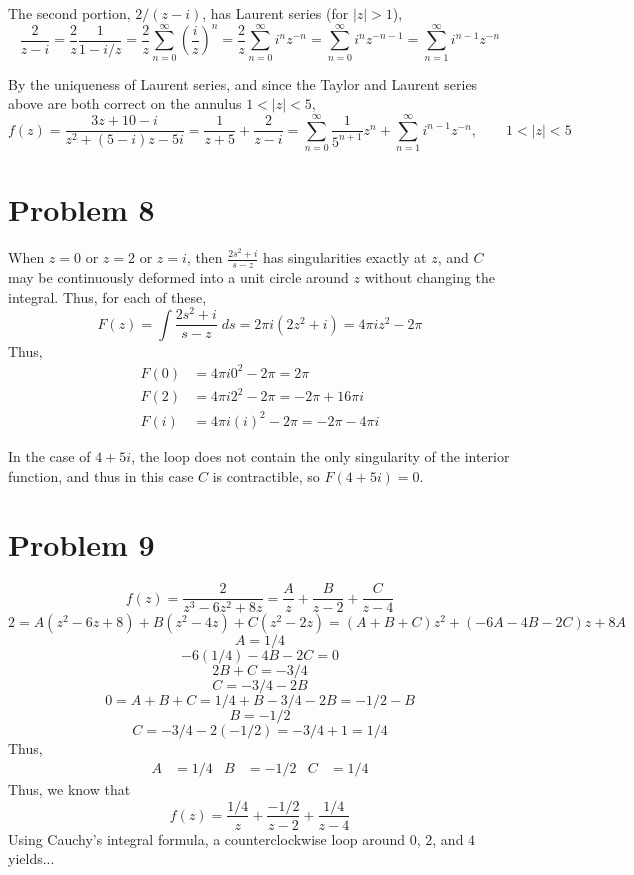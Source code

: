 \documentclass{article}
\theoremstyle{definition}
\newcommand{\p}[1]{\left(#1\right)}
\newcommand{\abs}[1]{\left|#1\right|}
\begin{document}
The second portion, $2/(z-i)$, has Laurent series (for $\abs{z} > 1$),
\[
\frac{2}{z-i} 
= \frac{2}{z} \frac{1}{1-i/z}
= \frac{2}{z} \sum_{n=0}^\infty \p{\frac{i}{z}}^n
= \frac{2}{z} \sum_{n=0}^\infty i^n z^{-n}
= \sum_{n=0}^\infty i^n z^{-n-1}
= \sum_{n=1}^\infty i^{n-1} z^{-n}
\]

By the uniqueness of Laurent series, 
and since the Taylor and Laurent series above are both correct on the annulus
$1 < \abs{z} < 5$, 
\[
f(z) 
= \frac{3z+10-i}{z^2+(5-i)z-5i}
= \frac{1}{z+5} + \frac{2}{z-i}
= \sum_{n=0}^\infty \frac{1}{5^{n+1}} z^n
+ \sum_{n=1}^\infty i^{n-1} z^{-n}, 
\qquad 1 < \abs{z} < 5
\]

\section{Problem 8}
\begin{figure}[h!]
\centering
{}
\end{figure}
When $z=0$ or $z=2$ or $z=i$, then $\frac{2s^2+i}{s-z}$ has singularities exactly at $z$, and 
$C$ may be continuously deformed into a unit circle around $z$ without changing the integral. Thus,
for each of these,
\[ F(z) = \int \frac{2 s^2 + i}{s-z} \;ds = 2 \pi i (2 z^2 + i) = 4 \pi i z^2 - 2 \pi \]
Thus,
\begin{align*}
F(0) &= 4 \pi i 0^2 - 2\pi = 2\pi \\
F(2) &= 4 \pi i 2^2 - 2 \pi = -2 \pi + 16 \pi i \\
F(i) &= 4 \pi i (i)^2 - 2 \pi = -2\pi - 4 \pi i 
\end{align*}

In the case of $4+5i$, the loop does not contain the only singularity of the interior function, 
and thus in this case $C$ is contractible, so $F(4+5i)=0$.

\section{Problem 9}
\[ 
f(z)
= \frac{2}{z^3-6z^2+8z}
= \frac{A}{z} + \frac{B}{z-2} + \frac{C}{z-4}
\]
\[
2 
= A (z^2-6z+8) + B (z^2-4z) + C(z^2-2z)
= (A+B+C)z^2 + (-6A-4B-2C)z + 8A
\]
\[ A = 1/4 \]
\[ -6 (1/4) -4B -2C = 0 \]
\[ 2B+C=-3/4 \]
\[ C=-3/4 - 2B \]
\[ 0 = A+B+C = 1/4 + B -3/4-2B =-1/2-B\]
\[ B=-1/2 \]
\[ C=-3/4 - 2(-1/2) = -3/4 +1 = 1/4 \]
Thus,
\begin{align*}
A &= 1/4 & B &= -1/2 & C &= 1/4
\end{align*}
Thus, we know that
\[ 
f(z) 
= \frac{1/4}{z} + \frac{-1/2}{z-2} + \frac{1/4}{z-4} 
\]
Using Cauchy's integral formula, a counterclockwise loop around $0$, $2$, and $4$
yields...
\end{document}
